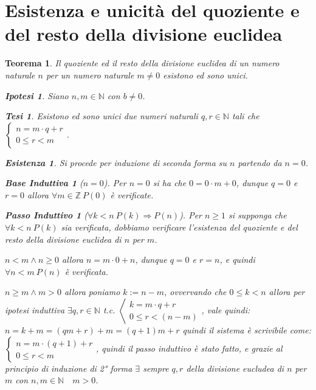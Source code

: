 \documentclass{article}
\makeatletter
\renewenvironment{proof}[1][\proofname]{\par
    \pushQED{\qed}%
    \normalfont \topsep6\p@\@plus6\p@\relax
    \trivlist
    \item\relax
    {\itshape
    #1\@addpunct{.}}\hspace\labelsep\ignorespaces
    }{%
    \popQED\endtrivlist\@endpefalse
}
\newtheorem{theorem}{Teorema}[part]
\newtheorem{ipothesis}[lemma]{Ipotesi}
\newtheorem{thesis}[lemma]{Tesi}
\theoremstyle{definition}
\newtheorem*{existence}{Esistenza}
\newtheorem*{base}{Base Induttiva}
\newtheorem*{step}{Passo Induttivo}
\newcommand{\N}{\mathbb{N}}
\makeatother
\begin{document}
\section{Esistenza e unicità del quoziente e del resto della divisione euclidea}
\begin{theorem}
    Il quoziente ed il resto della divisione euclidea di un numero naturale \(n\) per un numero naturale \(m\neq 0\) esistono ed sono unici.
    \begin{ipothesis}
        Siano \(n,m\in\mathbb{N}\) con \(b\neq 0\).
    \end{ipothesis}
    \begin{thesis}
        Esistono ed sono unici due numeri naturali \(q,r\in\mathbb{N}\) tali che \(\begin{cases} n=m\cdot q+r\\0\leq r<m\end{cases}\).
    \end{thesis}
    \begin{proof}
        \begin{existence}
            Si procede per induzione di seconda forma su \(n\) partendo da \(n=0\).
            \begin{base}[$n=0$]
                Per \(n=0\) si ha che \(0=0\cdot m+0\), dunque \(q=0\) e \(r=0\) allora \(\forall m\in\mathbb{Z}\ P(0)\) è verificate.
            \end{base}
            \begin{step}[$\forall k<n\ P(k)\Rightarrow P(n)$]
                Per \(n\geq1\) si supponga che \(\forall k<n\ P(k)\) sia verificata, dobbiamo verificare l'esistenza del quoziente e del resto della divisione euclidea di \(n\) per \(m\).
                \begin{list}{\leftmargin=1.5em}
                    \item{\(n<m\land n\geq 0\)} allora \(n=m\cdot 0+n\), dunque \(q=0\) e \(r=n\), e quindi \(\forall n<m\ P(n)\) è verificata.
                    \item{\(n\geq m\land m>0\)} allora poniamo \(k:=n-m\), ovvervando che \(0\leq k<n\) allora per ipotesi induttiva \(\exists q,r\in\N\) t.c. \(\left<\begin{aligned}k=m\cdot q+r\\0\leq r<(n-m)\end{aligned}\right.\), vale quindi: \(n=k+m=(qm+r)+m=(q+1)m+r\) quindi il sistema è scrivibile come: \(\begin{cases}n=m\cdot (q+1)+r\\0\leq r<m\end{cases}\), quindi il passo induttivo è stato fatto, e grazie al principio di induzione di 2° forma \(\exists\) sempre \(q,r\) della divisione eucludea di \(n\) per \(m\) con \(n,m\in\N\quad m> 0\).

\end{list}
\end{step}
\end{existence}
\end{proof}
\end{theorem}
\end{document}

